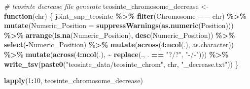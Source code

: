 \documentclass[
]{article}
\newenvironment{Shaded}{\begin{snugshade}}{\end{snugshade}}
\newcommand{\AttributeTok}[1]{\textcolor[rgb]{0.13,0.29,0.53}{#1}}
\newcommand{\CommentTok}[1]{\textcolor[rgb]{0.56,0.35,0.01}{\textit{#1}}}
\newcommand{\ControlFlowTok}[1]{\textcolor[rgb]{0.13,0.29,0.53}{\textbf{#1}}}
\newcommand{\DecValTok}[1]{\textcolor[rgb]{0.00,0.00,0.81}{#1}}
\newcommand{\FunctionTok}[1]{\textcolor[rgb]{0.13,0.29,0.53}{\textbf{#1}}}
\newcommand{\NormalTok}[1]{#1}
\newcommand{\OtherTok}[1]{\textcolor[rgb]{0.56,0.35,0.01}{#1}}
\newcommand{\SpecialCharTok}[1]{\textcolor[rgb]{0.81,0.36,0.00}{\textbf{#1}}}
\newcommand{\StringTok}[1]{\textcolor[rgb]{0.31,0.60,0.02}{#1}}
\begin{document}
\begin{Shaded}
\begin{Highlighting}[]
\CommentTok{\# teosinte decrease file generate}
\NormalTok{teosinte\_chromosome\_decrease }\OtherTok{\textless{}{-}} \ControlFlowTok{function}\NormalTok{(chr) \{}
\NormalTok{  joint\_snp\_teosinte }\SpecialCharTok{\%\textgreater{}\%}
    \FunctionTok{filter}\NormalTok{(Chromosome }\SpecialCharTok{==}\NormalTok{ chr) }\SpecialCharTok{\%\textgreater{}\%}
    \FunctionTok{mutate}\NormalTok{(}\AttributeTok{Numeric\_Position =} \FunctionTok{suppressWarnings}\NormalTok{(}\FunctionTok{as.numeric}\NormalTok{(Position))) }\SpecialCharTok{\%\textgreater{}\%} 
    \FunctionTok{arrange}\NormalTok{(}\FunctionTok{is.na}\NormalTok{(Numeric\_Position), }\FunctionTok{desc}\NormalTok{(Numeric\_Position)) }\SpecialCharTok{\%\textgreater{}\%} 
    \FunctionTok{select}\NormalTok{(}\SpecialCharTok{{-}}\NormalTok{Numeric\_Position) }\SpecialCharTok{\%\textgreater{}\%}  
    \FunctionTok{mutate}\NormalTok{(}\FunctionTok{across}\NormalTok{(}\DecValTok{4}\SpecialCharTok{:}\FunctionTok{ncol}\NormalTok{(.), as.character)) }\SpecialCharTok{\%\textgreater{}\%}
    \FunctionTok{mutate}\NormalTok{(}\FunctionTok{across}\NormalTok{(}\DecValTok{4}\SpecialCharTok{:}\FunctionTok{ncol}\NormalTok{(.), }\SpecialCharTok{\textasciitilde{}} \FunctionTok{replace}\NormalTok{(., . }\SpecialCharTok{==} \StringTok{"?/?"}\NormalTok{, }\StringTok{"{-}/{-}"}\NormalTok{))) }\SpecialCharTok{\%\textgreater{}\%}  
    \FunctionTok{write\_tsv}\NormalTok{(}\FunctionTok{paste0}\NormalTok{(}\StringTok{"teosinte\_data/teosinte\_chrom"}\NormalTok{, chr, }\StringTok{"\_decrease.txt"}\NormalTok{))}
\NormalTok{\}}

\FunctionTok{lapply}\NormalTok{(}\DecValTok{1}\SpecialCharTok{:}\DecValTok{10}\NormalTok{, teosinte\_chromosome\_decrease)}
\end{Highlighting}
\end{Shaded}
\end{document}
